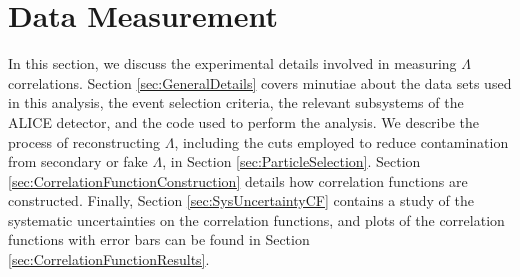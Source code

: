 \section{Data Measurement}
\label{sec:DataMeasurement}

In this section, we discuss the experimental details involved in measuring $\Lambda$ correlations.
Section \ref{sec:GeneralDetails} covers minutiae about the data sets used in this analysis, the event selection criteria, the relevant subsystems of the ALICE detector, and the code used to perform the analysis.
We describe the process of reconstructing $\Lambda$, including the cuts employed to reduce contamination from secondary or fake $\Lambda$, in Section \ref{sec:ParticleSelection}.
Section \ref{sec:CorrelationFunctionConstruction} details how correlation functions are constructed.
Finally, Section \ref{sec:SysUncertaintyCF} contains a study of the systematic uncertainties on the correlation functions, and plots of the correlation functions with error bars can be found in Section \ref{sec:CorrelationFunctionResults}.





